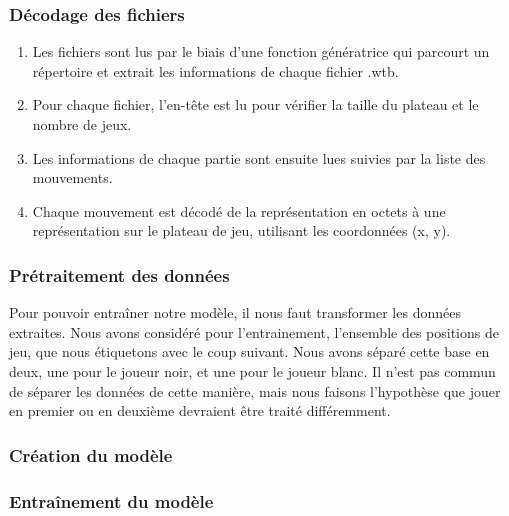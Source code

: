\subsubsection{Décodage des fichiers}
\begin{enumerate}
    \item Les fichiers sont lus par le biais d'une fonction génératrice qui parcourt un répertoire et extrait les informations de chaque fichier .wtb.
    \item Pour chaque fichier, l'en-tête est lu pour vérifier la taille du plateau et le nombre de jeux.
    \item Les informations de chaque partie sont ensuite lues suivies par la liste des mouvements.
    \item Chaque mouvement est décodé de la représentation en octets à une représentation sur le plateau de jeu, utilisant les coordonnées (x, y).
\end{enumerate}

\subsubsection{Prétraitement des données}
\label{subsubsec:preproc}
Pour pouvoir entraîner notre modèle, il nous faut transformer les données extraites. Nous avons considéré pour l'entrainement, l'ensemble des positions de jeu, que nous étiquetons avec le coup suivant. Nous avons séparé cette base en deux, une pour le joueur noir, et une pour le joueur blanc. Il n'est pas commun de séparer les données de cette manière, mais nous faisons l'hypothèse que jouer en premier ou en deuxième devraient être traité différemment.

\subsubsection{Création du modèle}
\label{subsubsec:model}

\subsubsection{Entraînement du modèle}
\label{subsubsec:train}

